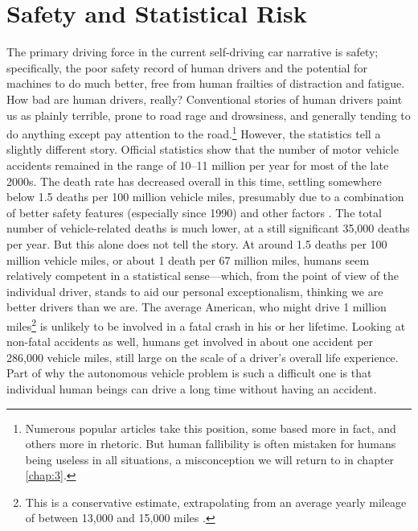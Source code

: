\section{Safety and Statistical Risk}



The primary driving force in the current self-driving car
narrative is safety; specifically, the poor safety record of human
drivers and the potential for machines to do much better, free from
human frailties of distraction and fatigue. How bad are human
drivers, really? Conventional stories of human drivers paint us as
plainly terrible, prone to road rage and drowsiness, and generally tending
to do anything except pay attention to the road.\footnote{Numerous popular
  articles take this position, some based more in fact, and others
  more in rhetoric. But human fallibility is often mistaken for humans
  being useless in 
  all situations, a misconception we will return to in chapter
  \ref{chap:3}.} However, the statistics tell
a slightly different story. Official statistics show that the number of
motor vehicle accidents remained in the range of 10--11 million
per year for most of the late 2000s. The death rate has
decreased overall in this time, settling somewhere below 1.5 deaths
per 100 million vehicle miles, presumably due to a combination of
better safety features (especially since 1990) and other
factors \cite{censusDeaths}. The total number of vehicle-related deaths is much
lower, at a still significant 35,000 deaths per year. But this alone
does not tell the story. At around 1.5 deaths per 100 million vehicle
miles, or about 1 death per 67 million miles, humans seem relatively
competent in a statistical sense---which, from the point of view of
the individual driver, stands to aid our personal exceptionalism,
thinking we are better drivers than we are. The average American, who might
drive 1 million miles\footnote{This is a conservative estimate,
  extrapolating from an average yearly mileage of between 13,000 and
  15,000 miles \cite{fhwa}.} is unlikely to be
involved in a fatal crash in his or her lifetime. Looking at non-fatal
accidents as well, humans get involved in about one accident per
286,000 vehicle miles, still large on the scale of a driver's overall
life experience. Part of why the autonomous vehicle problem is
such a difficult one is that individual human beings can drive a long
time without having an accident.

